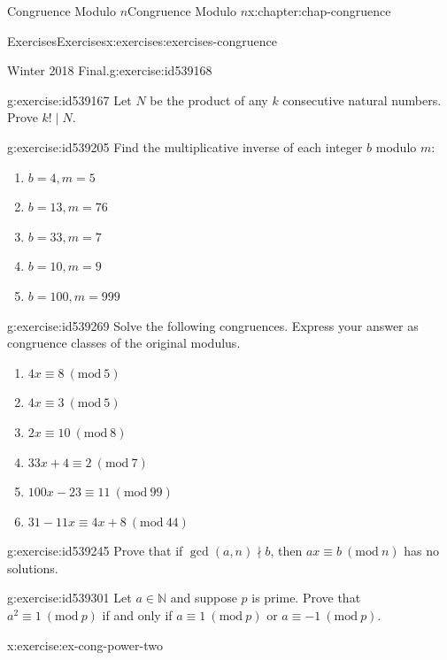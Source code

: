 \documentclass[oneside,10pt,]{book}
\numberwithin{equation}{section}
\newcommand{\Mod}[1]{\ \left(\mathrm{mod}\ #1\right)}
\begin{document}
\begin{chapterptx}{Congruence Modulo \(n\)}{}{Congruence Modulo \(n\)}{}{}{x:chapter:chap-congruence}
\begin{exercises-section}{Exercises}{}{Exercises}{}{}{x:exercises:exercises-congruence}
\begin{divisionexercise}{8}{Winter 2018 Final.}{}{g:exercise:id539168}
\end{divisionexercise}%
\begin{divisionexercise}{9}{}{}{g:exercise:id539167}%
Let \(N\) be the product of any \(k\) consecutive natural numbers. Prove \(k! \mid N\).%
\end{divisionexercise}%
\begin{divisionexercise}{10}{}{}{g:exercise:id539205}%
Find the multiplicative inverse of each integer \(b\) modulo \(m\):%
\begin{enumerate}[label=(\alph*)]
\item{}\(\displaystyle b = 4, m = 5\)%
\item{}\(\displaystyle b = 13, m = 76\)%
\item{}\(\displaystyle b = 33, m = 7\)%
\item{}\(\displaystyle b = 10, m = 9\)%
\item{}\(\displaystyle b = 100, m = 999\)%
\end{enumerate}
%
\end{divisionexercise}%
\begin{divisionexercise}{11}{}{}{g:exercise:id539269}%
Solve the following congruences. Express your answer as congruence classes of the original modulus.%
\begin{enumerate}[label=(\alph*)]
\item{}\(\displaystyle 4x \equiv 8 \Mod{5}\)%
\item{}\(\displaystyle 4x \equiv 3 \Mod{5}\)%
\item{}\(\displaystyle 2x \equiv 10 \Mod{8}\)%
\item{}\(\displaystyle 33x + 4 \equiv 2 \Mod{7}\)%
\item{}\(\displaystyle 100x - 23 \equiv 11 \Mod{99}\)%
\item{}\(\displaystyle 31 - 11x \equiv 4x + 8 \Mod{44}\)%
\end{enumerate}
%
\end{divisionexercise}%
\begin{divisionexercise}{12}{}{}{g:exercise:id539245}%
Prove that if \(\gcd(a,n) \nmid b\), then \(ax \equiv b \Mod{n}\) has no solutions.%
\end{divisionexercise}%
\begin{divisionexercise}{13}{}{}{g:exercise:id539301}%
Let \(a \in \mathbb{N}\) and suppose \(p\) is prime. Prove that \(a^2 \equiv 1 \Mod{p}\) if and only if \(a \equiv 1 \Mod{p}\) or \(a \equiv -1 \Mod{p}\).%
\end{divisionexercise}%
\begin{divisionexercise}{14}{}{}{x:exercise:ex-cong-power-two}%

\end{divisionexercise}
\end{exercises-section}
\end{chapterptx}
\end{document}

